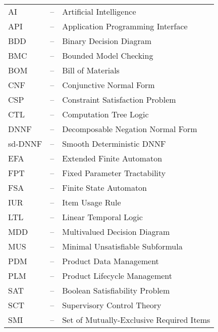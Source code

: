 
\begin{tabular}{ l c l }

 AI  & -- & Artificial Intelligence\\
 API & -- & Application Programming Interface \\
 BDD & -- & Binary Decision Diagram\\
 BMC & -- & Bounded Model Checking\\
 BOM & -- & Bill of Materials\\
 CNF & -- & Conjunctive Normal Form\\
 CSP & -- & Constraint Satisfaction Problem\\
 CTL & -- & Computation Tree Logic\\
 DNNF & -- & Decomposable Negation Normal Form\\
 sd-DNNF & -- & Smooth Deterministic DNNF\\
 EFA & -- & Extended Finite Automaton\\
 FPT & -- & Fixed Parameter Tractability\\
 FSA & -- & Finite State Automaton\\
 IUR & -- & Item Usage Rule\\
 LTL & -- & Linear Temporal Logic\\
 MDD & -- & Multivalued Decision Diagram\\
 MUS & -- & Minimal Unsatisfiable Subformula\\
 PDM & -- & Product Data Management         \\
 PLM & -- & Product Lifecycle Management   \\
 SAT & -- & Boolean Satisfiability Problem\\
 SCT & -- & Supervisory Control Theory   \\
 SMI & -- & Set of Mutually-Exclusive Required Items\\

\end{tabular}
